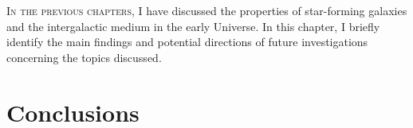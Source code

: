     \BgThispage
    
    \fancyhf{}
    \fancyfoot[C]{\color{white}\thepage}
    \newpage
    \setFancyHdr
\fi

\lettrine{I}{n the previous chapters}, I have discussed the properties of star-forming galaxies and the intergalactic medium in the early Universe. In this chapter, I briefly identify the main findings and potential directions of future investigations concerning the topics discussed.

\section{Conclusions}
\label{chCsec:Conclusions}

